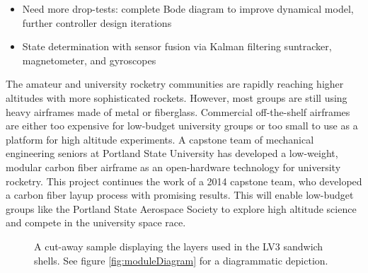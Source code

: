 \documentclass[8pt]{beamer}
\begin{document}
\begin{frame}[plain]
\begin{itemize}
\item Need more drop-tests: complete Bode diagram to improve dynamical model, further controller design iterations
\item State determination with sensor fusion via Kalman filtering suntracker, magnetometer, and gyroscopes
\end{itemize}
\tiny
\parbox{10in}{
The amateur and university rocketry communities are rapidly reaching higher altitudes with more sophisticated rockets. However, most groups are still using heavy airframes made of metal or fiberglass. Commercial off-the-shelf airframes are either too expensive for low-budget university groups or too small to use as a platform for high altitude experiments. 
A capstone team of mechanical engineering seniors at Portland State University has developed a low-weight, modular carbon fiber airframe as an open-hardware technology for university rocketry. 
This project continues the work of a 2014 capstone team, who developed a carbon fiber layup process with promising results. 
This will enable low-budget groups like the Portland State Aerospace Society to explore high altitude science and compete in the university space race.  


\begin{figure}[h]
\def\svgwidth{10in}

\caption{
	Diagram of the male end of a module. 
	The CF (1) is bonded to the honeycomb core (3) and the aluminum coupling ring (4) using structural adhesive (2). 
	The adhesive also serves as a protective coating for the CF and provides a smooth outer surface. 
	See figure \ref{fig:coupon} for a picture of this design.
	}
\label{fig:moduleDiagram}
\hfill

\caption{
	A cut-away sample displaying the layers used in the LV3 sandwich shells. 
	See figure \ref{fig:moduleDiagram} for a diagrammatic depiction.
	}
\label{fig:coupon}
\end{figure}
}
\end{frame}
\end{document}
